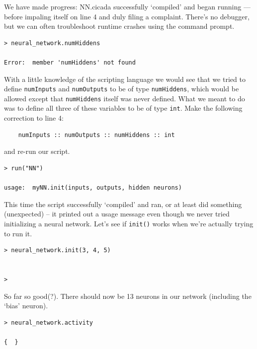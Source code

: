 \documentclass{article}
\newenvironment{code}{
       \begin{list}{}{
               \setlength{\leftmargin}{.4in}
               \setlength{\rightmargin}{0in}
               \setlength{\topsep}{.2in}
       }
       \small
       \item[] }
       { \end{list}   }
\begin{document}
We have made progress:  NN.cicada successfully `compiled' and began running --- before impaling itself on line 4 and duly filing a complaint.  There's no debugger, but we can often troubleshoot runtime crashes using the command prompt.

\begin{code} \begin{verbatim}
> neural_network.numHiddens

Error:  member 'numHiddens' not found
\end{verbatim} \end{code}

\noindent With a little knowledge of the scripting language we would see that we tried to define \verb#numInputs# and \verb#numOutputs# to be of type \verb#numHiddens#, which would be allowed except that \verb#numHiddens# itself was never defined.  What we meant to do was to define all three of these variables to be of type \verb#int#.  Make the following correction to line 4:

\begin{code} \begin{verbatim}
    numInputs :: numOutputs :: numHiddens :: int
\end{verbatim} \end{code}

\noindent and re-run our script.

\begin{code} \begin{verbatim}
> run("NN")

usage:  myNN.init(inputs, outputs, hidden neurons)
\end{verbatim} \end{code}

This time the script successfully `compiled' and ran, or at least did something (unexpected) -- it printed out a usage message even though we never tried initializing a neural network.  Let's see if \verb#init()# works when we're actually trying to run it.

\begin{code} \begin{verbatim}
> neural_network.init(3, 4, 5)


>
\end{verbatim} \end{code}

\noindent So far so good(?).  There should now be 13 neurons in our network (including the `bias' neuron).

\begin{code} \begin{verbatim}
> neural_network.activity

{  }
\end{verbatim} \end{code}
\end{document}
